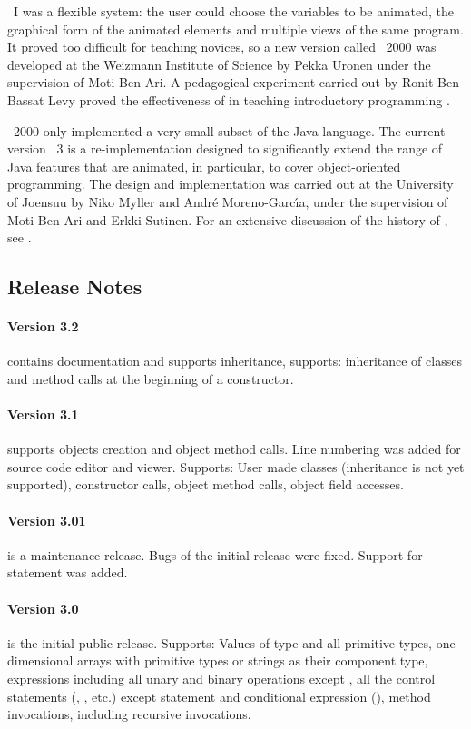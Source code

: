 \jel{}~I was a flexible system: the user could choose the variables to be animated, the graphical form of the animated elements and multiple views of the same program. It proved too difficult for teaching novices, so a new version called \jel{}~2000 was developed at the Weizmann Institute of Science by Pekka Uronen under the supervision of Moti Ben-Ari. A pedagogical experiment carried out by Ronit Ben-Bassat Levy proved the effectiveness of \jel{} in teaching introductory programming \citep{Levy2003}.

\jel{}~2000 only implemented a very small subset of the Java language. The current version \jel{}~3 is a re-implementation designed to significantly extend the range of Java features that are animated, in particular, to cover object-oriented programming. The design and implementation was carried out at the University of Joensuu by Niko Myller and Andr{\'{e}} Moreno-Garc{\'{\i}}a, under the supervision of Moti Ben-Ari and Erkki Sutinen. For an extensive discussion of the history of \jel{}, see \citep{Benari2002a}.

\subsection{Release Notes}
\label{sec:Release_Notes}

\paragraph{Version 3.2} contains documentation and supports inheritance, supports: inheritance of classes and  method calls at the beginning of a constructor.

\paragraph{Version 3.1} supports objects creation and object method calls. Line numbering was added for source code editor and viewer. Supports: User made classes (inheritance is not yet supported), constructor calls, object method calls, object field accesses.

\paragraph{Version 3.01} is a maintenance release. Bugs of the initial release were fixed. Support for  statement was added.

\paragraph{Version 3.0} is the initial public release. Supports: Values of type  and all primitive types, one-dimensional arrays with primitive types or strings as their component type, expressions including all unary and binary operations except , all the control statements (, , etc.) except  statement and conditional expression (), method invocations, including recursive invocations.

